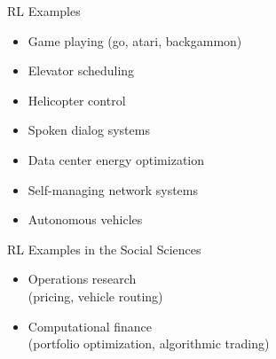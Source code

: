 \documentclass[11pt,table]{beamer}
\begin{document}
\begin{frame}{RL Examples}

\begin{itemize}
\item Game playing (go, atari, backgammon)
\item Elevator scheduling
\item Helicopter control
\item Spoken dialog systems
\item Data center energy optimization
\item Self-managing network systems
\item Autonomous vehicles
\end{itemize}
\end{frame}


\begin{frame}{RL Examples in the Social Sciences}

\begin{itemize}
\item Operations research\\ (pricing, vehicle routing)
\item Computational finance\\ (portfolio optimization, algorithmic trading)
\end{itemize}

\end{frame}
\end{document}
